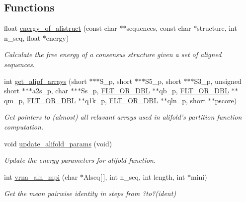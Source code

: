 \subsection*{Functions}
\begin{DoxyCompactItemize}
\item 
float \hyperlink{group__consensus__fold_ga1c48869c03b49a342bf4cbdd61900081}{energy\-\_\-of\-\_\-alistruct} (const char $\ast$$\ast$sequences, const char $\ast$structure, int n\-\_\-seq, float $\ast$energy)
\begin{DoxyCompactList}\small\item\em Calculate the free energy of a consensus structure given a set of aligned sequences. \end{DoxyCompactList}\item 
int \hyperlink{group__consensus__fold_ga5349960075b1847720a2e9df021e2675}{get\-\_\-alipf\-\_\-arrays} (short $\ast$$\ast$$\ast$S\-\_\-p, short $\ast$$\ast$$\ast$S5\-\_\-p, short $\ast$$\ast$$\ast$S3\-\_\-p, unsigned short $\ast$$\ast$$\ast$a2s\-\_\-p, char $\ast$$\ast$$\ast$Ss\-\_\-p, \hyperlink{group__data__structures_ga31125aeace516926bf7f251f759b6126}{F\-L\-T\-\_\-\-O\-R\-\_\-\-D\-B\-L} $\ast$$\ast$qb\-\_\-p, \hyperlink{group__data__structures_ga31125aeace516926bf7f251f759b6126}{F\-L\-T\-\_\-\-O\-R\-\_\-\-D\-B\-L} $\ast$$\ast$qm\-\_\-p, \hyperlink{group__data__structures_ga31125aeace516926bf7f251f759b6126}{F\-L\-T\-\_\-\-O\-R\-\_\-\-D\-B\-L} $\ast$$\ast$q1k\-\_\-p, \hyperlink{group__data__structures_ga31125aeace516926bf7f251f759b6126}{F\-L\-T\-\_\-\-O\-R\-\_\-\-D\-B\-L} $\ast$$\ast$qln\-\_\-p, short $\ast$$\ast$pscore)
\begin{DoxyCompactList}\small\item\em Get pointers to (almost) all relavant arrays used in alifold's partition function computation. \end{DoxyCompactList}\item 
void \hyperlink{group__consensus__fold_gac484c6bd429bafbd353b91044508d8e9}{update\-\_\-alifold\-\_\-params} (void)
\begin{DoxyCompactList}\small\item\em Update the energy parameters for alifold function. \end{DoxyCompactList}\item 
int \hyperlink{group__consensus__fold_ga20fd17bb27891009af7ce839f5386177}{vrna\-\_\-aln\-\_\-mpi} (char $\ast$Alseq\mbox{[}$\,$\mbox{]}, int n\-\_\-seq, int length, int $\ast$mini)
\begin{DoxyCompactList}\small\item\em Get the mean pairwise identity in steps from ?to?(ident) \end{DoxyCompactList}\item 

\end{DoxyCompactItemize}
